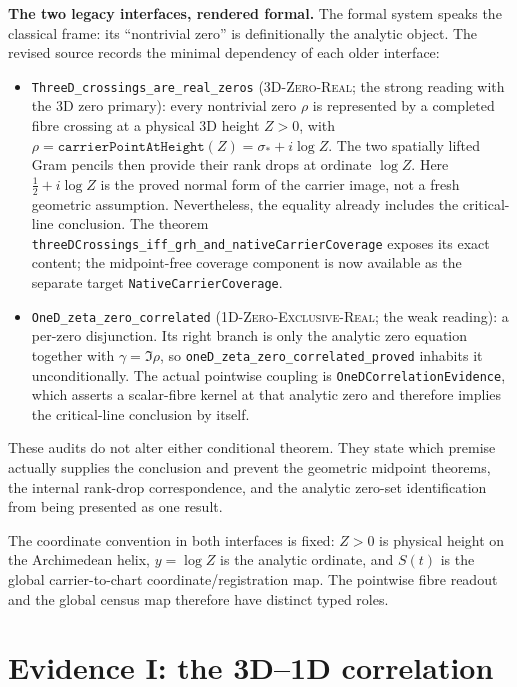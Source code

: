 \documentclass[11pt]{article}
\theoremstyle{definition}
\begin{document}
\medskip
\noindent\textbf{The two legacy interfaces, rendered formal.} The formal
system speaks the classical frame: its ``nontrivial zero'' is definitionally
the analytic object.  The revised source records the minimal dependency of
each older interface:
\begin{itemize}
\item \texttt{ThreeD\_crossings\_are\_real\_zeros} (\textsc{3D-Zero-Real};
the strong reading with the 3D zero primary): every nontrivial zero \(\rho\)
is represented by a completed fibre crossing at a physical 3D height
\(Z>0\), with
\(\rho=\texttt{carrierPointAtHeight}(Z)=\sigma_*+i\log Z\). The two
spatially lifted Gram pencils then provide their rank drops at ordinate
\(\log Z\). Here \(\tfrac12+i\log Z\) is the proved normal form of the
carrier image, not a fresh
geometric assumption.  Nevertheless, the equality already includes the
critical-line conclusion.  The theorem
\texttt{threeDCrossings\_iff\_grh\_and\_nativeCarrierCoverage} exposes its
exact content; the midpoint-free coverage component is now available as the
separate target \texttt{NativeCarrierCoverage}.
\item \texttt{OneD\_zeta\_zero\_correlated} (\textsc{1D-Zero-Exclusive-Real};
the weak reading): a per-zero disjunction.  Its right branch is only the
analytic zero equation together with \(\gamma=\Im\rho\), so
\texttt{oneD\_zeta\_zero\_correlated\_proved} inhabits it unconditionally.
The actual pointwise coupling is \texttt{OneDCorrelationEvidence}, which
asserts a scalar-fibre kernel at that analytic zero and therefore implies the
critical-line conclusion by itself.
\end{itemize}
These audits do not alter either conditional theorem.  They state which
premise actually supplies the conclusion and prevent the geometric midpoint
theorems, the internal rank-drop correspondence, and the analytic zero-set
identification from being presented as one result.

The coordinate convention in both interfaces is fixed: $Z>0$ is physical
height on the Archimedean helix, $y=\log Z$ is the analytic ordinate, and
$S(t)$ is the global carrier-to-chart coordinate/registration map.  The
pointwise fibre readout and the global census map therefore have distinct
typed roles.

\section{Evidence I: the 3D--1D correlation}\label{sec:grh-E1}
\end{document}
